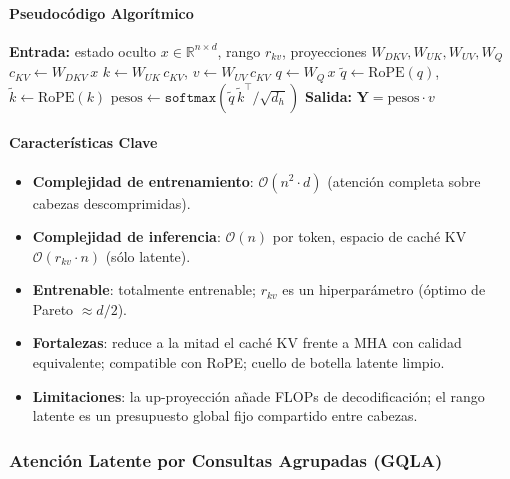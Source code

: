 \paragraph{Pseudocódigo Algorítmico}
\begin{algorithmic}[1]
\State \textbf{Entrada:} estado oculto $x \in \mathbb{R}^{n \times d}$, rango $r_{kv}$, proyecciones $W_{DKV}, W_{UK}, W_{UV}, W_{Q}$
\State $c_{KV} \gets W_{DKV}\, x$ 
\State $k \gets W_{UK}\, c_{KV}$, \quad $v \gets W_{UV}\, c_{KV}$ 
\State $q \gets W_{Q}\, x$
\State $\tilde q \gets \text{RoPE}(q)$, \quad $\tilde k \gets \text{RoPE}(k)$ 
\State $\text{pesos} \gets \texttt{softmax}(\tilde q\, \tilde k^\top / \sqrt{d_h})$
\State \textbf{Salida:} $\mathbf{Y} = \text{pesos} \cdot v$
\end{algorithmic}

\paragraph{Características Clave}
\begin{itemize}[leftmargin=*]
    \item \textbf{Complejidad de entrenamiento}: $\mathcal{O}(n^2 \cdot d)$ (atención completa sobre cabezas descomprimidas).
    \item \textbf{Complejidad de inferencia}: $\mathcal{O}(n)$ por token, espacio de caché KV $\mathcal{O}(r_{kv} \cdot n)$ (sólo latente).
    \item \textbf{Entrenable}: totalmente entrenable; $r_{kv}$ es un hiperparámetro (óptimo de Pareto $\approx d/2$).
    \item \textbf{Fortalezas}: reduce a la mitad el caché KV frente a MHA con calidad equivalente; compatible con RoPE; cuello de botella latente limpio.
    \item \textbf{Limitaciones}: la up-proyección añade FLOPs de decodificación; el rango latente es un presupuesto global fijo compartido entre cabezas.
\end{itemize}

\subsubsection{Atención Latente por Consultas Agrupadas (GQLA)}

